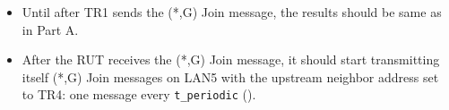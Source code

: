 \documentclass[11pt]{report}
\begin{document}
\begin{itemize}
\end{itemize}


\begin{itemize}

  \item Until after TR1 sends the (*,G) Join message, the results should be
  same as in Part A.

  \item After the RUT receives the (*,G) Join message, it should start
  transmitting itself (*,G) Join messages on LAN5 with the upstream
  neighbor address set to TR4: one message every \verb=t_periodic=
  ({\PimsmTPeriodic}).

\end{itemize}

\end{document}
